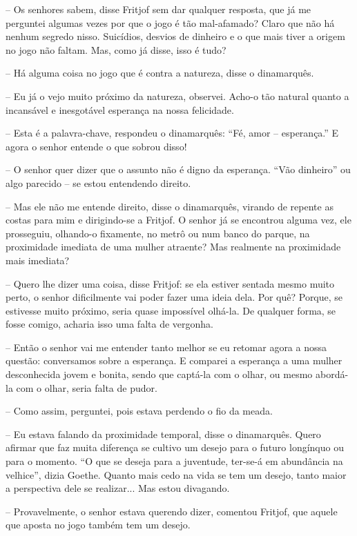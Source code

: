 -- Os senhores sabem, disse Fritjof sem dar qualquer resposta, que já me
perguntei algumas vezes por que o jogo é tão mal-afamado? Claro que não
há nenhum segredo nisso. Suicídios, desvios de dinheiro e o que mais
tiver a origem no jogo não faltam. Mas, como já disse, isso é tudo?

-- Há alguma coisa no jogo que é contra a natureza, disse o dinamarquês.

-- Eu já o vejo muito próximo da natureza, observei. Acho-o tão natural
quanto a incansável e inesgotável esperança na nossa felicidade.

-- Esta é a palavra-chave, respondeu o dinamarquês: ``Fé, amor --
esperança.'' E agora o senhor entende o que sobrou disso!

-- O senhor quer dizer que o assunto não é digno da esperança. ``Vão
dinheiro'' ou algo parecido -- se estou entendendo direito.

-- Mas ele não me entende direito, disse o dinamarquês, virando de
repente as costas para mim e dirigindo-se a Fritjof. O senhor já se
encontrou alguma vez, ele prosseguiu, olhando-o fixamente, no metrô ou
num banco do parque, na proximidade imediata de uma mulher atraente? Mas
realmente na proximidade mais imediata?

-- Quero lhe dizer uma coisa, disse Fritjof: se ela estiver sentada
mesmo muito perto, o senhor dificilmente vai poder fazer uma ideia dela.
Por quê? Porque, se estivesse muito próximo, seria quase impossível
olhá-la. De qualquer forma, se fosse comigo, acharia isso uma falta de
vergonha.

-- Então o senhor vai me entender tanto melhor se eu retomar agora a
nossa questão: conversamos sobre a esperança. E comparei a esperança a
uma mulher desconhecida jovem e bonita, sendo que captá-la com o olhar,
ou mesmo abordá-la com o olhar, seria falta de pudor.

-- Como assim, perguntei, pois estava perdendo o fio da meada.

-- Eu estava falando da proximidade temporal, disse o dinamarquês. Quero
afirmar que faz muita diferença se cultivo um desejo para o futuro
longínquo ou para o momento. ``O que se deseja para a juventude,
ter-se-á em abundância na velhice'', dizia Goethe. Quanto mais cedo na
vida se tem um desejo, tanto maior a perspectiva dele se realizar... Mas
estou divagando.

-- Provavelmente, o senhor estava querendo dizer, comentou Fritjof, que
aquele que aposta no jogo também tem um desejo.


